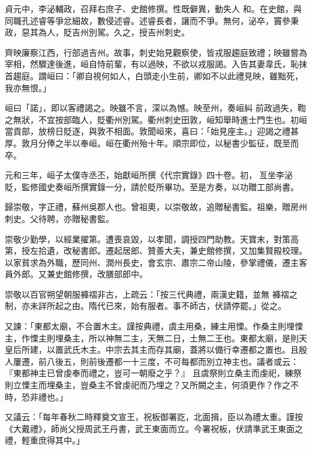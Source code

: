 \begin{pinyinscope}
 貞元中，李泌輔政，召拜右庶子、史館修撰。性既僻異，動失人
 和。在史館，與同職孔述睿等爭忿細故，數侵述睿。述睿長者，讓而不爭。無何，泌卒，竇參秉政，惡其為人，貶吉州別駕。久之，授吉州刺史。



 齊映廉察江西，行部過吉州。故事，刺史始見觀察使，皆戎服趨庭致禮；映雖嘗為宰相，然驟達後進，峘自恃前輩，有以過映，不欲以戎服謁。入告其妻韋氏，恥抹首趨庭。謂峘曰：「卿自視何如人，白頭走小生前，卿如不以此禮見映，雖黜死，我亦無恨。」



 峘曰「諾」，即以客禮謁之。映雖不言，深以為憾。映至州，奏峘糾
 前政過失，鞫之無狀，不宜按部臨人，貶衢州別駕。衢州刺史田敦，峘知舉時進士門生也。初峘當貢部，放榜日貶逐，與敦不相面。敦聞峘來，喜曰：「始見座主。」迎謁之禮甚厚。敦月分俸之半以奉峘。峘在衢州殆十年。順宗即位，以秘書少監征，既至而卒。



 元和三年，峘子太僕寺丞丕，始獻峘所撰《代宗實錄》四十卷。初，亙坐李泌貶，監修國史奏峘所撰實錄一分，請於貶所畢功。至是方奏，以功贈工部尚書。



 歸崇敬，字正禮，蘇州吳郡人也。曾祖奧，以崇敬故，追贈秘書監。祖樂，贈房州刺史。父待聘，亦贈秘書監。



 崇敬少勤學，以經業擢第。遭喪哀毀，以孝聞，調授四門助教。天寶末，對策高第，授左拾遺，改秘書郎。遷起居郎、贊善大夫，兼史館修撰，又加集賢殿校理。以家貧求為外職，歷同州、潤州長史，會玄宗、肅宗二帝山陵，參掌禮儀，遷主客員外郎。又兼史館修撰，改膳部郎中。



 崇敬以百官朔望朝服褲褶非古，上疏云：「按三代典禮，兩漢史籍，並無
 褲褶之制，亦未詳所起之由。隋代已來，始有服者。事不師古，伏請停罷。」從之。



 又諫：「東都太廟，不合置木主。謹按典禮，虞主用桑，練主用慄。作桑主則埋慄主，作慄主則埋桑主，所以神無二主，天無二日，土無二王也。東都太廟，是則天皇后所建，以置武氏木主。中宗去其主而存其廟，蓋將以備行幸遷都之置也。且殷人屢遷，前八後五，則前後遷都一十三度，不可每都而別立神主也。議者或云：『東都神主已曾虔奉而禮之，豈可一朝廢之乎？』
 且虞祭則立桑主而虔祀，練祭則立慄主而埋桑主，豈桑主不曾虔祀而乃埋之？又所闕之主，何須更作？作之不時，恐非禮也。」



 又議云：「每年春秋二時釋奠文宣王，祝板御署訖，北面揖，臣以為禮太重。謹按《大戴禮》，師尚父授周武王丹書，武王東面而立。今署祝板，伏請準武王東面之禮，輕重庶得其中。」




\end{pinyinscope}
